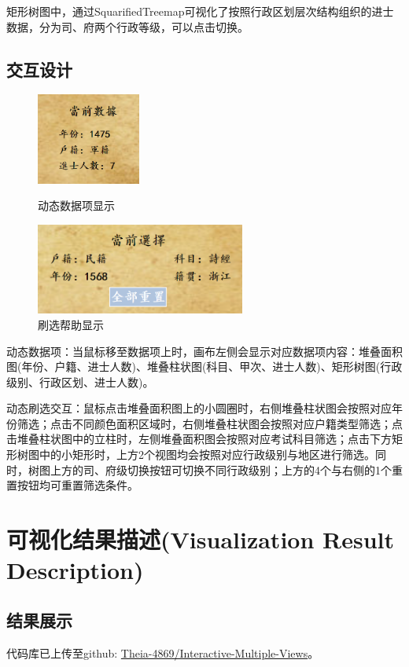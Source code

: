 \documentclass[11pt]{article}
\begin{document}
	矩形树图中，通过SquarifiedTreemap可视化了按照行政区划层次结构组织的进士数据，分为司、府两个行政等级，可以点击切换。
	
	\subsection{交互设计}
	\begin{figure}[h]
		\begin{minipage}[h]{0.5\linewidth}
			\centering
			\includegraphics[height=3cm]{../Figure/nowData.png}
			\caption{动态数据项显示}
		\end{minipage}
		\begin{minipage}[h]{0.5\linewidth}
			\centering
			\includegraphics[height=3cm]{../Figure/nowChoice.png}
			\caption{刷选帮助显示}
		\end{minipage}
	\end{figure}

	动态数据项：当鼠标移至数据项上时，画布左侧会显示对应数据项内容：堆叠面积图(年份、户籍、进士人数)、堆叠柱状图(科目、甲次、进士人数)、矩形树图(行政级别、行政区划、进士人数)。
	
	动态刷选交互：鼠标点击堆叠面积图上的小圆圈时，右侧堆叠柱状图会按照对应年份筛选；点击不同颜色面积区域时，右侧堆叠柱状图会按照对应户籍类型筛选；点击堆叠柱状图中的立柱时，左侧堆叠面积图会按照对应考试科目筛选；点击下方矩形树图中的小矩形时，上方2个视图均会按照对应行政级别与地区进行筛选。同时，树图上方的司、府级切换按钮可切换不同行政级别；上方的4个与右侧的1个重置按钮均可重置筛选条件。
	
	\section{可视化结果描述(Visualization Result Description)}
	\subsection{结果展示}
	代码库已上传至github: \href{https://github.com/Theia-4869/Interactive-Multiple-Views}{Theia-4869/Interactive-Multiple-Views}。
	
\end{document}
